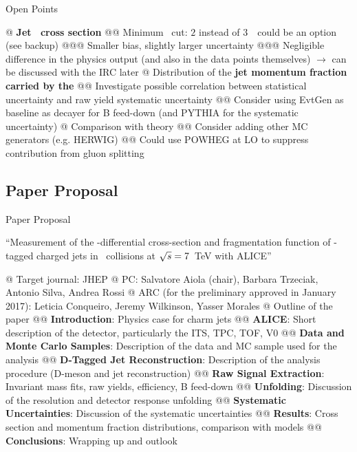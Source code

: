 \documentclass[xcolor={usenames,dvipsnames}, aspectratio=169]{beamer}
\begin{document}
\begin{frame}[fragile]{Open Points}
\footnotesize
\begin{easylist}[itemize]
@ \textbf{Jet \pt\ cross section}
@@ Minimum \ptd\ cut: $2$ instead of $3$~\GeVc\ could be an option (see backup)
@@@ Smaller bias, slightly larger uncertainty
@@@ Negligible difference in the physics output (and also in the data points themselves) $\rightarrow$ can be discussed with the IRC later
@ Distribution of the \textbf{jet momentum fraction carried by the \Dzero}
@@ Investigate possible correlation between statistical uncertainty and raw yield systematic uncertainty
@@ Consider using EvtGen as baseline as decayer for B feed-down (and PYTHIA for the systematic uncertainty)
@ Comparison with theory
@@ Consider adding other MC generators (e.g. HERWIG)
@@ Could use POWHEG at LO to suppress contribution from gluon splitting
\end{easylist}
\end{frame}

\subsection{Paper Proposal}

\begin{frame}[fragile]{Paper Proposal}
\vspace{-10pt}
\begin{center}
``Measurement of the \pt-differential cross-section and fragmentation function of \Dzero-tagged charged jets in \pp\ collisions at $\sqrt{s}=7$~TeV with ALICE''
\end{center}
\scriptsize
\begin{easylist}[itemize]
@ Target journal: JHEP
@ PC: Salvatore Aiola (chair), Barbara Trzeciak, Antonio Silva, Andrea Rossi
@ ARC (for the preliminary approved in January 2017): Leticia Conqueiro, Jeremy Wilkinson, Yasser Morales
 {
@ Outline of the paper
@@ \textbf{Introduction}: Physics case for charm jets
@@ \textbf{ALICE}: Short description of the detector, particularly the ITS, TPC, TOF, V0
@@ \textbf{Data and Monte Carlo Samples}: Description of the data and MC sample used for the analysis
@@ \textbf{D-Tagged Jet Reconstruction}: Description of the analysis procedure (D-meson and jet reconstruction)
@@ \textbf{Raw Signal Extraction}: Invariant mass fits, raw yields, efficiency, B feed-down
@@ \textbf{Unfolding}: Discussion of the resolution and detector response unfolding
@@ \textbf{Systematic Uncertainties}: Discussion of the systematic uncertainties
@@ \textbf{Results}: Cross section and momentum fraction distributions, comparison with models
@@ \textbf{Conclusions}: Wrapping up and outlook
}
\end{easylist}
\end{frame}
\end{document}
